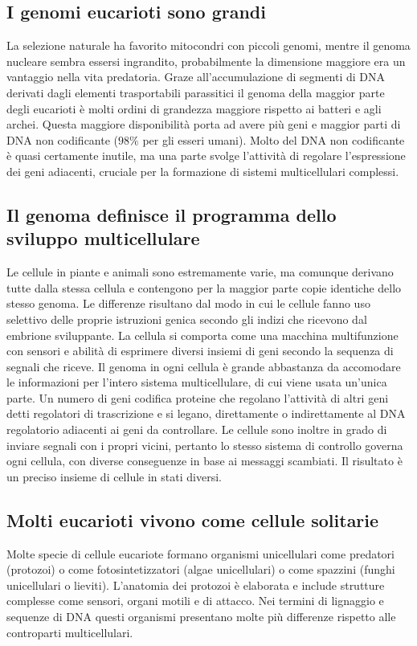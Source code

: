 \subsection{I genomi eucarioti sono grandi}
La selezione naturale ha favorito mitocondri con piccoli genomi, mentre il genoma nucleare sembra essersi ingrandito, probabilmente la dimensione maggiore era un vantaggio nella vita
predatoria. Graze all'accumulazione di segmenti di DNA derivati dagli elementi trasportabili parassitici il genoma della maggior parte degli eucarioti \`e molti ordini di grandezza 
maggiore rispetto ai batteri e agli archei. Questa maggiore disponibilit\`a porta ad avere pi\`u geni e maggior parti di DNA non codificante ($98\%$ per gli esseri umani).
Molto del DNA non codificante \`e quasi certamente inutile, ma una parte svolge l'attivit\`a di regolare l'espressione dei geni adiacenti, cruciale per la formazione di sistemi 
multicellulari complessi. 
\subsection{Il genoma definisce il programma dello sviluppo multicellulare}
Le cellule in piante e animali sono estremamente varie, ma comunque derivano tutte dalla stessa cellula e contengono per la maggior parte copie identiche dello stesso genoma. Le 
differenze risultano dal modo in cui le cellule fanno uso selettivo delle proprie istruzioni genica secondo gli indizi che ricevono dal embrione sviluppante. La cellula si comporta come
una macchina multifunzione con sensori e abilit\`a di esprimere diversi insiemi di geni secondo la sequenza di segnali che riceve. Il genoma in ogni cellula \`e grande abbastanza da
accomodare le informazioni per l'intero sistema multicellulare, di cui viene usata un'unica parte. Un numero di geni codifica proteine che regolano l'attivit\`a di altri geni detti
regolatori di trascrizione e si legano, direttamente o indirettamente al DNA regolatorio adiacenti ai geni da controllare. Le cellule sono inoltre in grado di inviare segnali con i 
propri vicini, pertanto lo stesso sistema di controllo governa ogni cellula, con diverse conseguenze in base ai messaggi scambiati. Il risultato \`e un preciso insieme di cellule in 
stati diversi. 
\subsection{Molti eucarioti vivono come cellule solitarie}
Molte specie di cellule eucariote formano organismi unicellulari come predatori (protozoi) o come fotosintetizzatori (algae unicellulari) o come spazzini
(funghi unicellulari o lieviti). L'anatomia dei protozoi \`e elaborata e include strutture complesse come sensori, organi motili e di attacco. Nei termini
di lignaggio e sequenze di DNA questi organismi presentano molte pi\`u differenze rispetto alle controparti multicellulari. 
